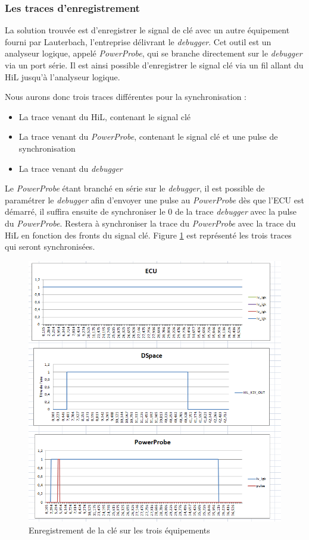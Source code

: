 \subsubsection{Les traces d'enregistrement}\label{tracesSync}
La solution trouvée est d'enregistrer le signal de clé avec un autre équipement fourni par Lauterbach, l'entreprise délivrant le \textit{debugger}. Cet outil est un analyseur logique, appelé \textit{PowerProbe}, qui se branche directement sur le \textit{debugger} via un port série. Il est ainsi possible d'enregistrer le signal clé via un fil allant du HiL jusqu'à l'analyseur logique.

Nous aurons donc trois traces différentes pour la synchronisation : 
\begin{itemize}
	\item La trace venant du HiL, contenant le signal clé
	\item La trace venant du \textit{PowerProbe}, contenant le signal clé et une pulse de synchronisation
	\item La trace venant du \textit{debugger}
\end{itemize}

Le \textit{PowerProbe} étant branché en série sur le \textit{debugger}, il est possible de paramétrer le \textit{debugger} afin d'envoyer une pulse au \textit{PowerProbe} dès que l'ECU est démarré, il suffira ensuite de synchroniser le 0 de la trace \textit{debugger} avec la pulse du \textit{PowerProbe}. Restera à synchroniser la trace du \textit{PowerProbe} avec la trace du HiL en fonction des fronts du signal clé. Figure \ref{fig:tracesigk} est représenté les trois traces qui seront synchronisées. 

\begin{figure}[H]
	\centering
	\includegraphics[width=0.61\linewidth]{contents/images/sync3}
	\caption{Enregistrement de la clé sur les trois équipements}
	\label{fig:tracesigk}
\end{figure}

